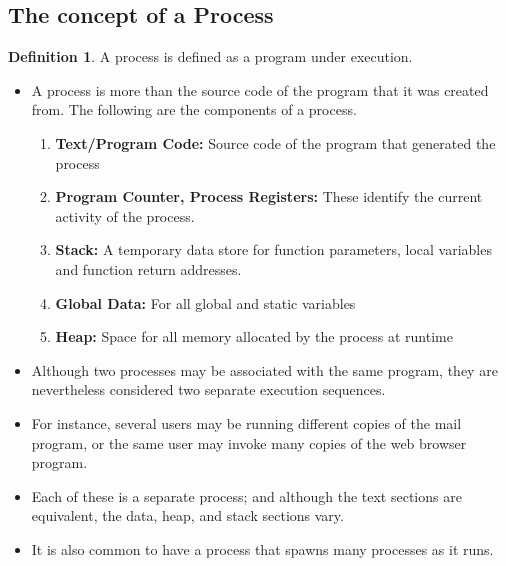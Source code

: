 \documentclass{article}
\theoremstyle{plain}
\theoremstyle{definition}
\newtheorem{defn}{Definition} %
\begin{document}
\subsection{The concept of a Process}
    \begin{defn}
    A process is defined as a program under execution. 
    \end{defn}
\begin{itemize}
    
    \item A process is more than the source code of the program that it was created from. The following are the components of a process.
    \begin{enumerate}
        \item \textbf{Text/Program Code:} Source code of the program that generated the process
        
        \item \textbf{Program Counter, Process Registers:} These identify the current activity of the process. 
        
        \item \textbf{Stack:} A temporary data store for function parameters, local variables and function return addresses.
        
        \item \textbf{Global Data:} For all global and static variables
        
        \item \textbf{Heap:} Space for all memory allocated by the process at runtime
    \end{enumerate}
    
    \item Although two processes may be associated with the same program, they are nevertheless considered two separate execution sequences. 
    
    \item For instance, several users may be running different copies of the mail program, or the same user may invoke many copies of the web browser program. 
    
    \item Each of these is a separate process; and although the text sections are equivalent, the data, heap, and stack sections vary. 
    
    \item It is also common to have a process that spawns many processes as it runs. 
\end{itemize}
\end{document}
